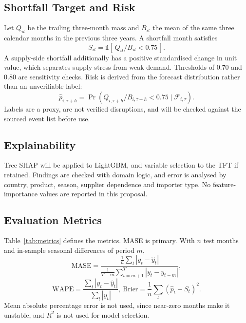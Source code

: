 \documentclass[conference]{IEEEtran}
\newcommand{\ind}{\mathbb{1}}
\begin{document}
\subsection{Shortfall Target and Risk}\label{sec:shortfall}
Let $Q_{it}$ be the trailing three-month mass and $B_{it}$ the mean of the same three calendar months in the previous three years. A shortfall month satisfies
\begin{equation}
S_{it}=\ind\!\left[\,Q_{it}/B_{it}<0.75\,\right].
\label{eq:shortfall}
\end{equation}
A supply-side shortfall additionally has a positive standardised change in unit value, which separates supply stress from weak demand. Thresholds of 0.70 and 0.80 are sensitivity checks. Risk is derived from the forecast distribution rather than an unverifiable label:
\begin{equation}
\hat{p}_{i,\tau+h}=\Pr\!\left(Q_{i,\tau+h}/B_{i,\tau+h}<0.75\mid\mathcal{F}_{i,\tau}\right).
\label{eq:risk}
\end{equation}
Labels are a proxy, are not verified disruptions, and will be checked against the sourced event list before use.

\subsection{Explainability}
Tree SHAP \cite{lundberg2017} will be applied to LightGBM, and variable selection to the TFT if retained. Findings are checked with domain logic, and error is analysed by country, product, season, supplier dependence and importer type. No feature-importance values are reported in this proposal.

\subsection{Evaluation Metrics}
Table~\ref{tab:metrics} defines the metrics. MASE is primary. With $n$ test months and in-sample seasonal differences of period $m$,
\begin{equation}
\mathrm{MASE}=\frac{\frac{1}{n}\sum_{t}|y_t-\hat{y}_t|}{\frac{1}{T-m}\sum_{t=m+1}^{T}|y_t-y_{t-m}|},
\label{eq:mase}
\end{equation}
\begin{equation}
\mathrm{WAPE}=\frac{\sum_{t}|y_t-\hat{y}_t|}{\sum_{t}|y_t|},\
\mathrm{Brier}=\frac{1}{n}\sum_{t}(\hat{p}_t-S_t)^2.
\label{eq:wape}
\end{equation}
Mean absolute percentage error is not used, since near-zero months make it unstable, and $R^2$ is not used for model selection.
\end{document}

